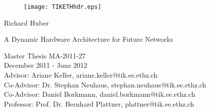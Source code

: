   \begin{titlepage}

  \begin{center}
  \begin{figure}[!t]
     \texttt{[image: TIKETHhdr.eps]}
  \end{figure}
  \end{center}

  \vspace{2 cm}
  
  \begin{center}
 

  {\large Richard Huber}
  \vspace{2 cm}


  {\Huge  A Dynamic Hardware Architecture for Future Networks}\\

  \vspace{\fill}

  Master Thesis MA-2011-27\\
  December 2011 - June 2012\\

  \vspace{1cm}
  Advisor: Ariane Keller, ariane.keller@tik.ee.ethz.ch\\
  Co-Advisor: Dr. Stephan Neuhaus, stephan.neuhaus@tik.ee.ethz.ch\\
  Co-Advisor: Daniel Borkmann, daniel.borkmann@tik.ee.ethz.ch\\
  Professor: Prof. Dr. Bernhard Plattner, plattner@tik.ee.ethz.ch\\
  \end{center}    
  \end{titlepage}
